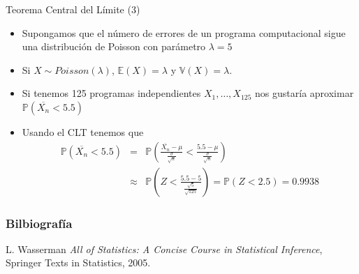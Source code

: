 \documentclass[handout]{beamer}
\begin{document}
\begin{frame}{Teorema Central del Límite (3)}
\scriptsize{
\begin{itemize}
 \item Supongamos que el número de errores de un programa computacional sigue una distribución de Poisson con parámetro $\lambda=5$
 \item Si $X \sim Poisson(\lambda)$, $\mathbb{E}(X)=\lambda$ y $\mathbb{V}(X)=\lambda$.
 \item Si tenemos 125 programas independientes $X_{1},\dots,X_{125}$ nos gustaría aproximar $\mathbb{P}(\overline{X_{n}} < 5.5)$
 \item Usando el CLT tenemos que
 \begin{eqnarray*}
 \mathbb{P}(\overline{X_{n}} < 5.5) & = & \mathbb{P} \left( \frac{\overline{X_{n}}-\mu}{\frac{\sigma}{\sqrt{n}}} <  \frac{5.5 -\mu}{\frac{\sigma}{\sqrt{n}}}  \right) \nonumber \\ 
                                    & \approx & \mathbb{P}\left( Z < \frac{5.5 - 5}{\frac{\sqrt{5}}{\sqrt{125}}}  \right) = \mathbb{P}( Z < 2.5) =0.9938
\end{eqnarray*}

\end{itemize}





}
 
\end{frame}





\begin{frame}[allowframebreaks]\scriptsize
\frametitle{Bilbiografía}
%
%
\begin{thebibliography}{8}

L. Wasserman \emph{All of Statistics: A Concise Course in Statistical Inference}, Springer Texts in Statistics, 2005.
\end{thebibliography}

%
\end{frame}









\end{document}
